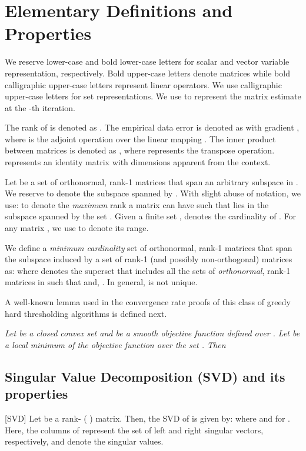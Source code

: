 \documentclass[twocolumn]{svjour3}
\begin{document}
\section{Elementary Definitions and Properties}{\label{sec:prel}}

We reserve lower-case and bold lower-case letters for scalar and vector variable representation, respectively. Bold upper-case letters denote matrices while bold calligraphic upper-case letters represent linear operators. We use calligraphic upper-case letters for set representations. We use  to represent the matrix estimate at the -th iteration. 

The rank of  is denoted as . The empirical data error is denoted as  with gradient ,  where  is the adjoint operation over the linear mapping . The inner product between matrices  is denoted as , where  represents the transpose operation.  represents an identity matrix with dimensions apparent from the context. 

Let  be a set of orthonormal, rank-1 matrices that span an arbitrary subspace in . We reserve  to denote the subspace spanned by . With slight abuse of notation, we use:
 to denote the {\it maximum} rank a matrix  can have such that  lies in the subspace spanned by the set . Given a finite set ,  denotes the cardinality of . For any matrix , we use  to denote its range.

We define a {\it minimum cardinality} set of orthonormal, rank-1 matrices that span the subspace induced by a set of rank-1 (and possibly non-orthogonal) matrices  as:
 where  denotes the superset that includes all the sets of {\it orthonormal}, rank-1 matrices in  such that   and, . In general,  is not unique.

A well-known lemma used in the convergence rate proofs of this class of greedy hard thresholding algorithms is defined next.

\begin{lemma}{\label{lemma:5}}\cite{Bertsekas} \textit{Let  be a closed convex set and  be a smooth objective function defined over . Let  be a local minimum of the objective function  over the set . Then}

\end{lemma}

\subsection{Singular Value Decomposition (SVD) and its properties}

\begin{definition}{\label{def:svd}}[SVD]
Let  be a rank- ( ) matrix. Then, the SVD of  is given by:
 where  and  for  . Here, the columns of  represent the set of left and right singular vectors, respectively, and  denote the singular values.
\end{definition}
\end{document}
